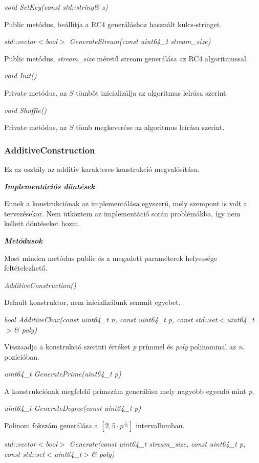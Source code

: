 \documentclass[hidelinks, 12pt]{article}
\begin{document}
\textit{void SetKey(const std::string\& s)}

Public metódus, beállítja a RC4 generáláshoz használt kulcs-stringet.

\textit{std::vector$<$bool$>$ GenerateStream(const uint64\_t stream\_size)}

Public metódus, \textit{stream\_size} méretű stream generálása az RC4 algoritmussal.

\textit{void Init()}

Private metódus, az $S$ tömböt inicializálja az algoritmus leírása szerint.

\textit{void Shuffle()}

Private metódus, az $S$ tömb megkeverése az algoritmus leírása szerint.

\subsubsection*{AdditiveConstruction}
Ez az osztály az additív karakteres konstrukció megvalósítása.

\textbf{\textit{Implementációs döntések}}

Ennek a konstrukciónak az implementálása egyszerű, mely szempont is volt a tervezésekor. Nem ütköztem az implementáció során problémákba, így nem kellett döntéseket hozni.

\textbf{\textit{Metódusok}}

Most minden metódus public és a megadott paraméterek helyessége feltételezhető.

\textit{AdditiveConstruction()}

Default konstruktor, nem inicializálunk semmit egyebet.

\textit{bool AdditiveChar(const uint64\_t n, const uint64\_t p, const std::set$<$uint64\_t$>$\& poly)}

Visszaadja a konstrukció szerinti értéket \textit{p} prímmel és \textit{poly} polinommal az \textit{n}. pozícióban.

\textit{uint64\_t GeneratePrime(uint64\_t p)}

A konstrukciónak megfelelő prímszám generálása mely nagyobb egyenlő mint \textit{p}.

\textit{uint64\_t GenerateDegree(const uint64\_t p)}

Polinom fokszám generálása a $[2, 5\cdot p^\frac{1}{10}]$ intervallumban.

\textit{std::vector$<$bool$>$ Generate(const uint64\_t stream\_size, const uint64\_t p, const std::set$<$uint64\_t$>$\& poly)}
\end{document}
